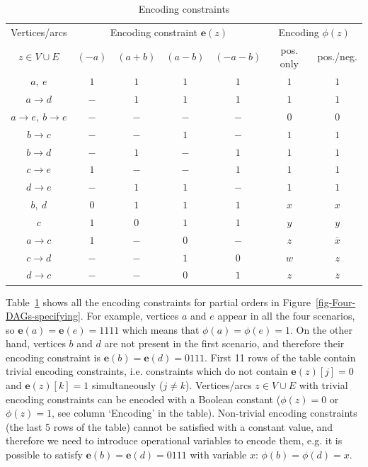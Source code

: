 \begin{table}[h]
\begin{centering}
\begin{tabular}{|c|c|c|c|c|c|c|}
\hline 
Vertices/arcs & \multicolumn{4}{c|}{Encoding constraint $\mathbf{e}(z)$} & \multicolumn{2}{c|}{Encoding $\phi(z)$}\tabularnewline
\cline{2-7} 
\multicolumn{1}{|c|}{$z\in V\cup E$} & $(-a)$ & $(a+b)$ & $(a-b)$ & $(-a-b)$ & \multicolumn{1}{c|}{pos. only} & \multicolumn{1}{c|}{pos./neg.}\tabularnewline
\hline 
\hline 
$a,\ e$ & $1$ & $1$ & $1$ & $1$ & $1$ & $1$\tabularnewline
\hline 
$a\rightarrow d$ & $-$ & $1$ & $1$ & $1$ & $1$ & $1$\tabularnewline
\hline 
$a\rightarrow e,\ b\rightarrow e$ & $-$ & $-$ & $-$ & $-$ & $0$ & $0$\tabularnewline
\hline 
$b\rightarrow c$ & $-$ & $-$ & $1$ & $-$ & $1$ & $1$\tabularnewline
\hline 
$b\rightarrow d$ & $-$ & $1$ & $-$ & $1$ & $1$ & $1$\tabularnewline
\hline 
$c\rightarrow e$ & $1$ & $-$ & $-$ & $1$ & $1$ & $1$\tabularnewline
\hline 
$d\rightarrow e$ & $-$ & $1$ & $1$ & $-$ & $1$ & $1$\tabularnewline
\hline 
\hline 
$b,\ d$ & $0$ & $1$ & $1$ & $1$ & $x$ & $x$\tabularnewline
\hline 
$c$ & $1$ & $0$ & $1$ & $1$ & $y$ & $y$\tabularnewline
\hline 
$a\rightarrow c$ & $1$ & $-$ & $0$ & $-$ & $z$ & $\overline{x}$\tabularnewline
\hline 
$c\rightarrow d$ & $-$ & $-$ & $1$ & $0$ & $w$ & $z$\tabularnewline
\hline 
$d\rightarrow c$ & $-$ & $-$ & $0$ & $1$ & $z$ & $\overline{z}$\tabularnewline
\hline 
\end{tabular}

\par\end{centering}

\caption{Encoding constraints\label{tab:Encoding-contstraints}}
\end{table}


Table~\ref{tab:Encoding-contstraints} shows all the encoding constraints
for partial orders in Figure~\ref{fig-Four-DAGs-specifying}. For
example, vertices $a$ and $e$ appear in all the four scenarios,
so $\mathbf{e}(a)=\mathbf{e}(e)=1111$ which means that $\phi(a)=\phi(e)=1$.
On the other hand, vertices $b$ and $d$ are not present in the first
scenario, and therefore their encoding constraint is $\mathbf{e}(b)=\mathbf{e}(d)=0111$.
First 11 rows of the table contain trivial\emph{ }encoding\emph{ }constraints,
i.e. constraints which do not contain $\mathbf{e}(z)[j]=0$ and $\mathbf{e}(z)[k]=1$
simultaneously ($j\neq k$). Vertices/arcs $z\in V\cup E$ with trivial
encoding constraints can be encoded with a Boolean constant ($\phi(z)=0$
or $\phi(z)=1$, see column `Encoding' in the table). Non-trivial\emph{
}encoding\emph{ }constraints (the last 5 rows of the table) cannot
be satisfied with a constant value, and therefore we need to introduce
operational variables to encode them, e.g. it is possible to satisfy
$\mathbf{e}(b)=\mathbf{e}(d)=0111$ with variable $x$: $\phi(b)=\phi(d)=x$.

